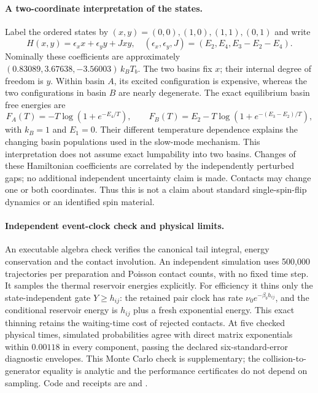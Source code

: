 \documentclass[11pt]{article}
\begin{document}
\paragraph{A two-coordinate interpretation of the states.}
Label the ordered states by $(x,y)=(0,0),(1,0),(1,1),(0,1)$ and write
\[
 H(x,y)=\epsilon_x x+\epsilon_y y+Jxy,
\quad
(\epsilon_x,\epsilon_y,J)=(E_2,E_4,E_3-E_2-E_4).
\]
Nominally these coefficients are approximately
$(0.83089,3.67638,-3.56003)\,k_BT_b$.
The two basins fix $x$; their internal degree of freedom is $y$.
Within basin $A$, its excited configuration is expensive, whereas the two
configurations in basin $B$ are nearly degenerate. The exact equilibrium
basin free energies are
\[
 F_A(T)=-T\log(1+e^{-E_4/T}),\qquad
 F_B(T)=E_2-T\log(1+e^{-(E_3-E_2)/T}),
\]
with $k_B=1$ and $E_1=0$. Their different temperature dependence explains
the changing basin populations used in the slow-mode mechanism. This
interpretation does not assume exact lumpability into two basins. Changes
of these Hamiltonian coefficients are correlated by the independently
perturbed gaps; no additional independent uncertainty claim is made.
Contacts may change one or both coordinates. Thus this is not a claim
about standard single-spin-flip dynamics or an identified spin material.

\paragraph{Independent event-clock check and physical limits.}
An executable algebra check verifies the canonical tail integral, energy
conservation and the contact involution. An independent simulation uses
500,000 trajectories per preparation and Poisson contact counts, with no
fixed time step. It samples the thermal reservoir energies explicitly.
For efficiency it thins only the state-independent gate $Y\geq h_{ij}$:
the retained pair clock has rate $\nu_0e^{-\beta_bh_{ij}}$, and the
conditional reservoir energy is $h_{ij}$ plus a fresh exponential energy.
This exact thinning retains the waiting-time cost of rejected contacts.
At five checked physical times, simulated probabilities agree with direct
matrix exponentials within $0.00118$ in every component, passing the
declared six-standard-error diagnostic envelopes. This Monte Carlo check
is supplementary; the collision-to-generator equality is analytic and
the performance certificates do not depend on sampling.
Code and receipts are  and
.
\end{document}
